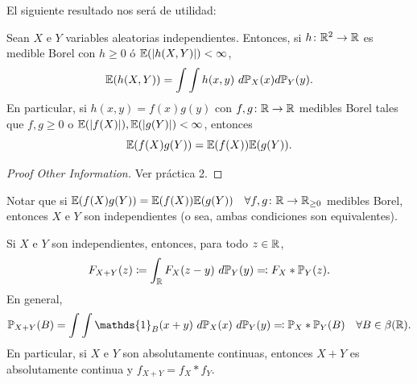 \noindent El siguiente resultado nos será de utilidad:

 \begin{theorem}
	 Sean $X$ e $Y$ variables aleatorias independientes. Entonces, si $h \colon \mathbb{R}^{2} \to \mathbb{R}$ es medible Borel con $h \geq 0$ ó $\mathbb{E}(|h(X,Y)|) < \infty$,
	 \[ \mbb{E}(h(X,Y)) = \int \int h(x,y) \ d\mbb{P}_{X}(x) d \mbb{P}_{Y}(y). \]
	 En particular, si $h(x,y) = f(x)g(y)$ con $f,g \colon \mathbb{R} \to \mathbb{R}$ medibles Borel tales que $f,g \geq 0$ o $\mathbb{E}(|f(X)|), \mathbb{E}(|g(Y)|) < \infty$, entonces
	 \[ \mathbb{E}(f(X)g(Y)) = \mathbb{E}(f(X)) \mathbb{E}(g(Y)). \]
 \end{theorem}
 \begin{proof}[Proof Other Information]
	 Ver práctica 2.
 \end{proof}

 \begin{remark}
	 Notar que si $\mathbb{E}(f(X)g(Y)) = \mathbb{E}(f(X)) \mathbb{E}(g(Y)) \quad \forall f,g \colon \mathbb{R} \to \mathbb{R}_{\geq 0}$ medibles Borel, entonces $X$ e $Y$ son independientes (o sea, ambas condiciones son equivalentes).
 \end{remark}

 \begin{corollary}
 	Si $X$ e $Y$ son independientes, entonces, para todo $z \in \mathbb{R}$,
	 \[ F_{X + Y}(z) \coloneq \int_{\mathbb{R}} F_{X}(z - y) \ d\mathbb{P}_{Y}(y) \eqcolon F_{X} * \mathbb{P}_{Y}(z). \]
	 En general, 
	 \[ \mbb{P}_{X + Y}(B) = \int \int \mathds{1}_{B}(x + y) \ d \mbb{P}_{X}(x) \ d \mbb{P}_{Y}(y) \eqcolon \mbb{P}_{X} * \mbb{P}_{Y} (B) \quad \forall B \in \beta(\R). \]
	 En particular, si $X$ e $Y$ son absolutamente continuas, entonces $X + Y$ es absolutamente continua y $f_{X + Y} = f_{X} * f_{Y}$.
 \end{corollary}

